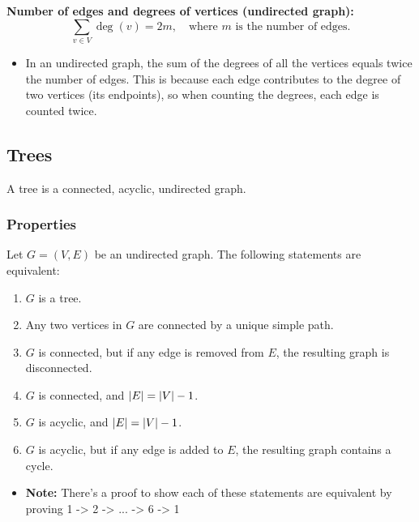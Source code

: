 \begin{example}
        \textbf{Number of edges and degrees of vertices (undirected graph):}
        \[
        \sum_{v \in V} \deg(v) = 2m, \quad \text{where } m \text{ is the number of edges.}
        \]
        \begin{itemize}
            \item In an undirected graph, the sum of the degrees of all the vertices equals twice the number of edges. This is because each edge contributes to the degree of two vertices (its endpoints), so when counting the degrees, each edge is counted twice.
        \end{itemize}
    \end{example}

\subsection{Trees}
    \begin{definition}
        A tree is a connected, acyclic, undirected graph. 
    \end{definition}

    \subsubsection{Properties}
    \begin{definition}
        Let $G=(V,E)$ be an undirected graph. The following statements are equivalent:
        \begin{enumerate}
            \item $G$ is a tree. 
            \item Any two vertices in $G$ are connected by a unique simple path. 
            \item $G$ is connected, but if any edge is removed from $E$, the resulting graph is disconnected. 
            \item $G$ is connected, and $\abs{E} = \abs{V} - 1$.
            \item $G$ is acyclic, and $\abs{E} = \abs{V} - 1$.
            \item $G$ is acyclic, but if any edge is added to $E$, the resulting graph contains a cycle.
        \end{enumerate}
        \begin{itemize}
            \item \textbf{Note:} There's a proof to show each of these statements are equivalent by proving 1 -> 2 -> ... -> 6 -> 1
        \end{itemize}
    \end{definition}


